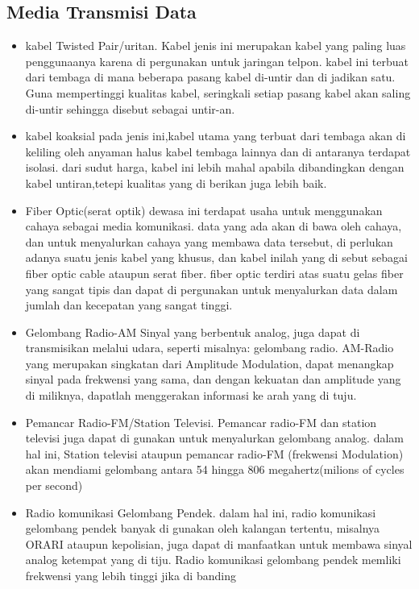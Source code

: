 \subsection{Media Transmisi Data}
\begin{itemize}
  \item kabel Twisted Pair/uritan.
        Kabel jenis ini merupakan kabel yang paling luas penggunaanya karena di pergunakan untuk jaringan telpon.
        kabel ini terbuat dari tembaga di mana beberapa pasang kabel di-untir dan di jadikan satu. Guna mempertinggi kualitas kabel, seringkali setiap pasang kabel akan saling di-untir sehingga disebut sebagai untir-an.
  \item kabel koaksial
        pada jenis ini,kabel utama yang terbuat dari tembaga akan di keliling oleh anyaman halus kabel tembaga lainnya dan di antaranya terdapat isolasi. dari sudut harga, kabel ini lebih mahal apabila dibandingkan dengan kabel untiran,tetepi kualitas yang di berikan juga lebih baik.
  \item Fiber Optic(serat optik)
        dewasa ini terdapat usaha untuk menggunakan cahaya sebagai media komunikasi. data yang ada akan di bawa oleh cahaya, dan untuk menyalurkan cahaya yang membawa data tersebut, di perlukan adanya suatu jenis kabel yang khusus, dan kabel inilah yang di sebut sebagai fiber optic cable ataupun serat fiber. fiber optic terdiri atas suatu gelas fiber yang sangat tipis dan dapat di pergunakan untuk menyalurkan data dalam jumlah dan kecepatan yang sangat tinggi.
  \item Gelombang Radio-AM
        Sinyal yang berbentuk analog, juga dapat di transmisikan melalui udara, seperti misalnya: gelombang radio. AM-Radio
        yang merupakan singkatan dari Amplitude Modulation, dapat menangkap sinyal pada frekwensi yang sama, dan dengan kekuatan dan amplitude yang di miliknya, dapatlah menggerakan informasi ke arah yang di tuju.
  \item Pemancar Radio-FM/Station Televisi.
        Pemancar radio-FM dan station televisi juga dapat di gunakan untuk menyalurkan gelombang analog. dalam hal ini, Station televisi ataupun pemancar radio-FM (frekwensi Modulation)
        akan mendiami gelombang antara 54 hingga 806 megahertz(milions of cycles per second)
  \item Radio komunikasi Gelombang Pendek.
        dalam hal ini, radio komunikasi gelombang pendek banyak di gunakan oleh kalangan tertentu, misalnya ORARI ataupun kepolisian, juga dapat di manfaatkan untuk membawa sinyal analog ketempat yang di tiju. Radio komunikasi gelombang pendek memliki frekwensi yang lebih tinggi jika di banding

\end{itemize}
